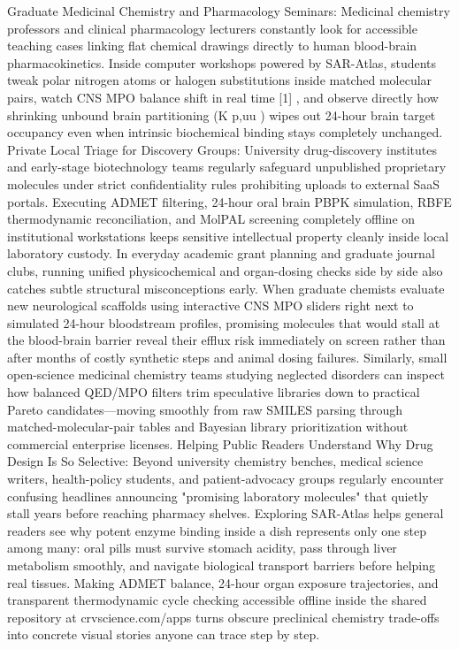 \documentclass[10pt,letterpaper]{article}
\begin{document}
Graduate Medicinal Chemistry and Pharmacology Seminars: Medicinal chemistry professors and clinical pharmacology lecturers constantly look for accessible teaching cases linking flat chemical drawings directly to human blood-brain pharmacokinetics. Inside computer workshops powered by SAR-Atlas, students tweak polar nitrogen atoms or halogen substitutions inside matched molecular pairs, watch CNS MPO balance shift in real time [1] , and observe directly how shrinking unbound brain partitioning (K p,uu ) wipes out 24-hour brain target occupancy even when intrinsic biochemical binding stays completely unchanged. Private Local Triage for Discovery Groups: University drug-discovery institutes and early-stage biotechnology teams regularly safeguard unpublished proprietary molecules under strict confidentiality rules prohibiting uploads to external SaaS portals. Executing ADMET filtering, 24-hour oral brain PBPK simulation, RBFE thermodynamic reconciliation, and MolPAL screening completely offline on institutional workstations keeps sensitive intellectual property cleanly inside local laboratory custody. In everyday academic grant planning and graduate journal clubs, running unified physicochemical and organ-dosing checks side by side also catches subtle structural misconceptions early. When graduate chemists evaluate new neurological scaffolds using interactive CNS MPO sliders right next to simulated 24-hour bloodstream profiles, promising molecules that would stall at the blood-brain barrier reveal their efflux risk immediately on screen rather than after months of costly synthetic steps and animal dosing failures. Similarly, small open-science medicinal chemistry teams studying neglected disorders can inspect how balanced QED/MPO filters trim speculative libraries down to practical Pareto candidates---moving smoothly from raw SMILES parsing through matched-molecular-pair tables and Bayesian library prioritization without commercial enterprise licenses. Helping Public Readers Understand Why Drug Design Is So Selective: Beyond university chemistry benches, medical science writers, health-policy students, and patient-advocacy groups regularly encounter confusing headlines announcing "promising laboratory molecules" that quietly stall years before reaching pharmacy shelves. Exploring SAR-Atlas helps general readers see why potent enzyme binding inside a dish represents only one step among many: oral pills must survive stomach acidity, pass through liver metabolism smoothly, and navigate biological transport barriers before helping real tissues. Making ADMET balance, 24-hour organ exposure trajectories, and transparent thermodynamic cycle checking accessible offline inside the shared repository at crvscience.com/apps turns obscure preclinical chemistry trade-offs into concrete visual stories anyone can trace step by step.
\end{document}
